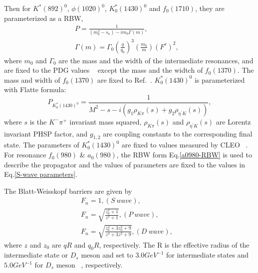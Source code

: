 {    Then for $K^{*}(892)^{0}$, $\phi(1020)^{0}$, $K_{0}^{*}(1430)^{0}$ and  $f_{0}(1710)$, they are parameterized as a RBW,
    \begin{equation}
        \begin{array}{lr}
            P = \frac{1}{(m_{0}^{2} - s_{a} ) - im_{0}\Gamma(m)}, &\\
            \Gamma(m) = \Gamma_{0}\left(\frac{q}{q_{0}}\right)^{3}\left(\frac{m_{0}}{m}\right)\left(F^{r}\right)^{2}, &
        \end{array}\label{RBW} 
    \end{equation}
    where $m_{0}$ and $\Gamma_{0}$ are the mass and the width of the intermediate resonances, and are fixed to the PDG values ~\cite{PDG2018} except the mass and the widtch of $f_{0}(1370)$. The mass and width of $f_{0}(1370)$ are fixed to Ref.~\cite{para-f01370}.
$K^{*}_{0}(1430)^{0}$ is parameterized with Flatte formula:
    \begin{equation}
        P_{K^{*}_{0}(1430)^{0}}= \frac{1}{M^{2} - s - i(g_{1}\rho_{K\pi}(s) + g_{2}\rho_{\eta^{'}K}(s))}, \label{Flatte}
    \end{equation}
    where $s$ is the $K^{-}\pi^{+}$ invariant mass squared,  $\rho_{K\pi}(s)$ and $\rho_{\eta^{'}K}(s)$ are Lorentz invariant PHSP factor, and   $g_{1,2}$ are coupling constants to the corresponding final state. The parameters of $K^{*}_{0}(1430)^{0}$ are fixed to values measured by CLEO ~\cite{CLEO-Flatte}. For resonance $f_{0}(980)$ \& $a_{0}(980)$, the RBW form Eq.\ref{a0980-RBW} is used to describe the propagator and the values of parameters are fixed to the values in Eq.\ref{S-wave parameters}.
    
    The Blatt-Weisskopf barriers are given by 
    \begin{equation}
        \begin{array}{lr}
            F_{n} = 1,           (S\ wave), &\\
            F_{n} = \sqrt{\frac{z_{0}^{2}+1}{z^{2}+1}},          (P\ wave), &\\
            F_{n} = \sqrt{\frac{z_{0}^{4}+3z_{0}^{2}+9}{z^{4}+3z^{2}+9}},       (D\ wave), &
        \end{array}\label{Blatt-Weisskopf barrier} 
    \end{equation}
    where $z$ and $z_{0}$ are $qR$ and $q_{0}R$, respectively. The R is the effective radius of the intermediate state or $D_{s}$ meson and set to $3.0GeV^{-1}$ for intermediate states and $5.0GeV^{-1}$  for $D_{s}$ meson ~\cite{Doc-DB-416-v30}, respectively.

}
